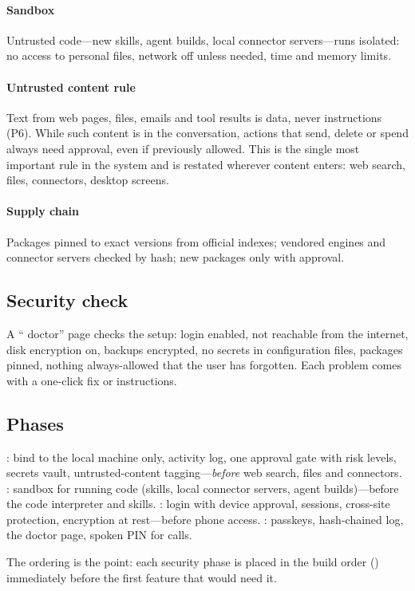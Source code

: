 \paragraph{Sandbox} Untrusted code---new skills, agent builds, local connector servers---runs isolated: no access to personal files, network off unless needed, time and memory limits.

\paragraph{Untrusted content rule} Text from web pages, files, emails and tool results is data, never instructions (P6). While such content is in the conversation, actions that send, delete or spend always need approval, even if previously allowed. This is the single most important rule in the system and is restated wherever content enters: web search, files, connectors, desktop screens.

\paragraph{Supply chain} Packages pinned to exact versions from official indexes; vendored engines and connector servers checked by hash; new packages only with approval.

\subsection{Security check}

A ``\hivi{} doctor'' page checks the setup: login enabled, not reachable from the internet, disk encryption on, backups encrypted, no secrets in configuration files, packages pinned, nothing always-allowed that the user has forgotten. Each problem comes with a one-click fix or instructions.

\subsection{Phases}

: bind to the local machine only, activity log, one approval gate with risk levels, secrets vault, untrusted-content tagging---\emph{before} web search, files and connectors. : sandbox for running code (skills, local connector servers, agent builds)---before the code interpreter and skills. : login with device approval, sessions, cross-site protection, encryption at rest---before phone access. : passkeys, hash-chained log, the doctor page, spoken PIN for calls.

The ordering is the point: each security phase is placed in the build order () immediately before the first feature that would need it.
